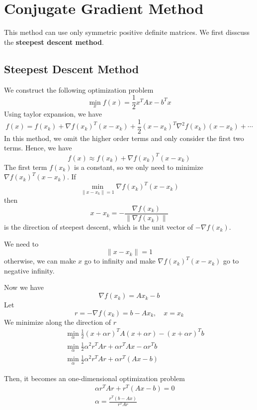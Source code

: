 \section{Conjugate Gradient Method}

This method can use only symmetric positive definite matrices. We first disscuss the \textbf{steepest descent method}. 

\subsection{Steepest Descent Method}

We construct the following optimization problem \[
    \min_{x} f(x) = \frac{1}{2} x^T A x - b^T x
\]
Using taylor expansion, we have \[
    f(x) = f(x_k) + \nabla f(x_k)^T (x - x_k) + \frac{1}{2} (x - x_k)^T \nabla^2 f(x_k) (x - x_k) + \cdots
\]
In this method, we omit the higher order terms and only consider the first two terms. Hence, we have \[
    f(x) \approx f(x_k) + \nabla f(x_k)^T (x - x_k)
\]
The first term $f(x_k)$ is a constant, so we only need to minimize $\nabla f(x_k)^T (x - x_k)$. If \[
    \min_{\|x - x_k\| = 1} \nabla f(x_k)^T (x - x_k)
\]
then \[
    x - x_k = - \frac{\nabla f(x_k)}{\|\nabla f(x_k)\|}
\]
is the direction of steepest descent, which is the unit vector of $-\nabla f(x_k)$.
\begin{note}
    We need to \[
        \| x - x_k \| = 1
    \]
    otherwise, we can make $x$ go to infinity and make $\nabla f(x_k)^T (x - x_k)$ go to negative infinity.
\end{note}

Now we have \[
    \nabla f(x_k) = Ax_k - b
\]
Let \[
    r = - \nabla f(x_k) = b - Ax_k, \quad x = x_k
\]
We minimize along the direction of $r$ 
\begin{eqnarray*}
&& \min_{\alpha}
\frac{1}{2} (x + \alpha r)^T A(x+ \alpha r)
 - (x + \alpha r)^T b \\  
&& \min_{\alpha}
\frac{1}{2} \alpha^2 r^T Ar
 + \alpha r^T A x - 
\alpha r^T b \\  
&& \min_{\alpha}
\frac{1}{2} \alpha^2 r^T Ar
 + \alpha r^T( A x - b) 
\end{eqnarray*}

Then, it becomes an one-dimensional optimization problem
\begin{eqnarray*}
&& \alpha r^T Ar + r^T(Ax - b) = 0 \\[6pt]
&& \alpha 
= \frac{r^T(b - Ax)}{r^T A r}
\end{eqnarray*}

